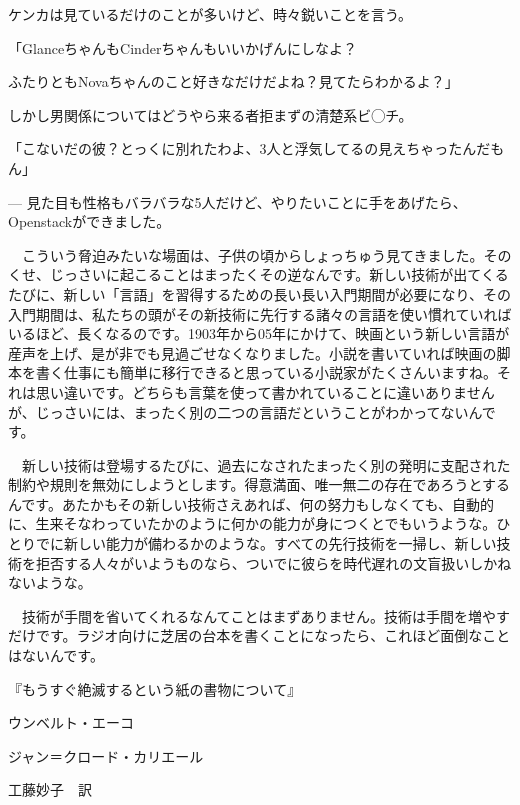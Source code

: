 \documentclass[9pt,b5paper,tombo,openany]{jsbook}
\begin{document}
ケンカは見ているだけのことが多いけど、時々鋭いことを言う。

「GlanceちゃんもCinderちゃんもいいかげんにしなよ？

ふたりともNovaちゃんのこと好きなだけだよね？見てたらわかるよ？」

しかし男関係についてはどうやら来る者拒まずの清楚系ビ◯チ。

「こないだの彼？とっくに別れたわよ、3人と浮気してるの見えちゃったんだもん」


--- 見た目も性格もバラバラな5人だけど、やりたいことに手をあげたら、Openstackができました。

\newpage

\thispagestyle{empty}

\begin{center}
\begin{minipage}{0.3\hsize}
\begin{tiny}
　こういう脅迫みたいな場面は、子供の頃からしょっちゅう見てきました。そのくせ、じっさいに起こることはまったくその逆なんです。新しい技術が出てくるたびに、新しい「言語」を習得するための長い長い入門期間が必要になり、その入門期間は、私たちの頭がその新技術に先行する諸々の言語を使い慣れていればいるほど、長くなるのです。1903年から05年にかけて、映画という新しい言語が産声を上げ、是が非でも見過ごせなくなりました。小説を書いていれば映画の脚本を書く仕事にも簡単に移行できると思っている小説家がたくさんいますね。それは思い違いです。どちらも言葉を使って書かれていることに違いありませんが、じっさいには、まったく別の二つの言語だということがわかってないんです。

　新しい技術は登場するたびに、過去になされたまったく別の発明に支配された制約や規則を無効にしようとします。得意満面、唯一無二の存在であろうとするんです。あたかもその新しい技術さえあれば、何の努力もしなくても、自動的に、生来そなわっていたかのように何かの能力が身につくとでもいうような。ひとりでに新しい能力が備わるかのような。すべての先行技術を一掃し、新しい技術を拒否する人々がいようものなら、ついでに彼らを時代遅れの文盲扱いしかねないような。

　技術が手間を省いてくれるなんてことはまずありません。技術は手間を増やすだけです。ラジオ向けに芝居の台本を書くことになったら、これほど面倒なことはないんです。
\begin{flushright}
『もうすぐ絶滅するという紙の書物について』

ウンベルト・エーコ

ジャン＝クロード・カリエール

工藤妙子　訳
\end{flushright}
\end{tiny}
\end{minipage}
\end{center}
\end{document}
